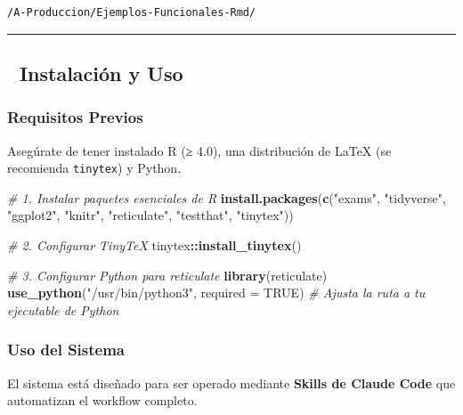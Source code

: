 \documentclass[
]{article}
\newenvironment{Shaded}{\begin{snugshade}}{\end{snugshade}}
\newcommand{\AttributeTok}[1]{\textcolor[rgb]{0.13,0.29,0.53}{#1}}
\newcommand{\CommentTok}[1]{\textcolor[rgb]{0.56,0.35,0.01}{\textit{#1}}}
\newcommand{\ConstantTok}[1]{\textcolor[rgb]{0.56,0.35,0.01}{#1}}
\newcommand{\FunctionTok}[1]{\textcolor[rgb]{0.13,0.29,0.53}{\textbf{#1}}}
\newcommand{\NormalTok}[1]{#1}
\newcommand{\SpecialCharTok}[1]{\textcolor[rgb]{0.81,0.36,0.00}{\textbf{#1}}}
\newcommand{\StringTok}[1]{\textcolor[rgb]{0.31,0.60,0.02}{#1}}
\begin{document}
\begin{verbatim}
/A-Produccion/Ejemplos-Funcionales-Rmd/
\end{verbatim}

\begin{center}\rule{0.5\linewidth}{0.5pt}\end{center}

\subsection{\texorpdfstring{🚀 \textbf{Instalación y
Uso}}{🚀 Instalación y Uso}}\label{instalaciuxf3n-y-uso}

\subsubsection{\texorpdfstring{\textbf{Requisitos
Previos}}{Requisitos Previos}}\label{requisitos-previos}

Asegúrate de tener instalado R (≥ 4.0), una distribución de LaTeX (se
recomienda \texttt{tinytex}) y Python.

\begin{Shaded}
\begin{Highlighting}[]
\CommentTok{\# 1. Instalar paquetes esenciales de R}
\FunctionTok{install.packages}\NormalTok{(}\FunctionTok{c}\NormalTok{(}\StringTok{"exams"}\NormalTok{, }\StringTok{"tidyverse"}\NormalTok{, }\StringTok{"ggplot2"}\NormalTok{, }\StringTok{"knitr"}\NormalTok{, }\StringTok{"reticulate"}\NormalTok{, }\StringTok{"testthat"}\NormalTok{, }\StringTok{"tinytex"}\NormalTok{))}

\CommentTok{\# 2. Configurar TinyTeX}
\NormalTok{tinytex}\SpecialCharTok{::}\FunctionTok{install\_tinytex}\NormalTok{()}

\CommentTok{\# 3. Configurar Python para reticulate}
\FunctionTok{library}\NormalTok{(reticulate)}
\FunctionTok{use\_python}\NormalTok{(}\StringTok{"/usr/bin/python3"}\NormalTok{, }\AttributeTok{required =} \ConstantTok{TRUE}\NormalTok{) }\CommentTok{\# Ajusta la ruta a tu ejecutable de Python}
\end{Highlighting}
\end{Shaded}

\subsubsection{\texorpdfstring{\textbf{Uso del
Sistema}}{Uso del Sistema}}\label{uso-del-sistema}

El sistema está diseñado para ser operado mediante \textbf{Skills de
Claude Code} que automatizan el workflow completo.
\end{document}
